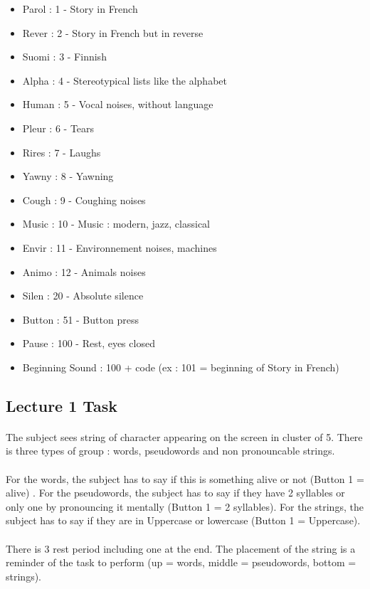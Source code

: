 \documentclass[a4paper]{article}
\begin{document}
\begin{itemize}
\item Parol : 1 - Story in French
\item Rever : 2 - Story in French but in reverse
\item Suomi : 3 - Finnish
\item Alpha : 4 - Stereotypical lists like the alphabet
\item Human : 5 - Vocal noises, without language
\item Pleur : 6 - Tears
\item Rires : 7 - Laughs
\item Yawny : 8 - Yawning
\item Cough : 9 - Coughing noises
\item Music : 10 - Music : modern, jazz, classical
\item Envir : 11 - Environnement noises, machines
\item Animo : 12 - Animals noises
\item Silen : 20 - Absolute silence
\item Button : 51 - Button press
\item Pause : 100 - Rest, eyes closed
\item Beginning Sound : 100 + code (ex : 101 = beginning of Story in French)
\end{itemize}

\subsection{Lecture 1 Task} \label{localec1}   
\paragraph{} The subject sees string of character appearing on the screen in cluster of 5. There is three types of group : words, pseudowords and non pronouncable strings. 
\paragraph{}
For the words, the subject has to say if this is something alive or not (Button 1 = alive) .
For the pseudowords, the subject has to say if they have 2 syllables or only one by pronouncing it mentally (Button 1 = 2 syllables).
For the strings,  the subject has to say if they are in Uppercase or lowercase (Button 1 = Uppercase). 
\paragraph{} 
There is 3 rest period including one at the end. 
The placement of the string is a reminder of the task to perform (up = words, middle = pseudowords, bottom = strings).
\end{document}
